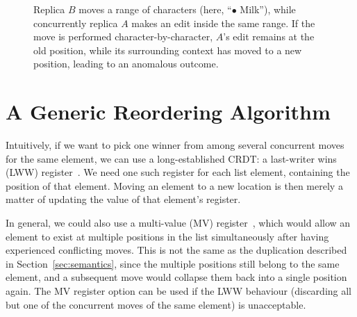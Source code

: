 \documentclass[sigplan,10pt]{acmart}
\begin{document}
\begin{figure}
    \caption{Replica $B$ moves a range of characters (here, ``$\bullet$ Milk''), while concurrently replica $A$ makes an edit inside the same range. If the move is performed character-by-character, $A$'s edit remains at the old position, while its surrounding context has moved to a new position, leading to an anomalous outcome.}
    \label{fig:range-bad}
\end{figure}

\section{A Generic Reordering Algorithm}\label{sec:algorithm}

Intuitively, if we want to pick one winner from among several concurrent moves for the same element, we can use a long-established CRDT: a last-writer wins (LWW) register~\cite{Shapiro:2011wy,Johnson:1975we}.
We need one such register for each list element, containing the position of that element.
Moving an element to a new location is then merely a matter of updating the value of that element's register.

In general, we could also use a multi-value (MV) register~\cite{Shapiro:2011wy}, which would allow an element to exist at multiple positions in the list simultaneously after having experienced conflicting moves.
This is not the same as the duplication described in Section~\ref{sec:semantics}, since the multiple positions still belong to the same element, and a subsequent move would collapse them back into a single position again.
The MV register option can be used if the LWW behaviour (discarding all but one of the concurrent moves of the same element) is unacceptable.
\end{document}
